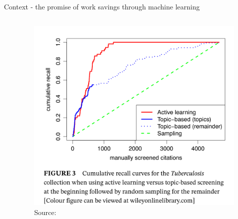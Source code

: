 \documentclass[9pt, aspectratio=169]{beamer}
\begin{document}
\begin{frame}{Context - the promise of work savings through machine learning}
\begin{columns}
\begin{column}{0.618\linewidth}
		
	\end{column}
	\begin{column}{0.382\linewidth}
		\begin{figure}
			\includegraphics[width=\linewidth]{images/example-recall}
			\caption{Source: \cite{Przybya2018}}
		\end{figure}
	\end{column}
\end{columns}

\end{frame}
\end{document}
